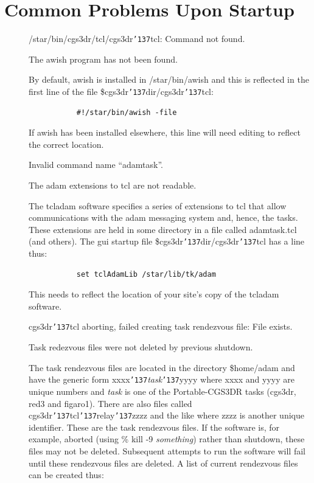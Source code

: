 \documentclass[a4paper]{book}
\renewcommand{\_}{{\tt\char'137}}
\begin{document}
\section{Common Problems Upon Startup}
\begin{description}
\item[] {\sf /star/bin/cgs3dr/tcl/cgs3dr\_tcl: Command not found.}

  The awish program has not been found.

  By default, awish is installed in /star/bin/awish and this is reflected
  in the first line of the file {\sc \$cgs3dr\_dir}/cgs3dr\_tcl:
  \begin{verbatim}
           #!/star/bin/awish -file
  \end{verbatim}
  If awish has been installed elsewhere, this line will need editing to reflect
  the correct location.

\item[] {\sf Invalid command name ``adamtask''.}

  The {\sc adam} extensions to tcl are not readable.

  The {\sc tcladam} software specifies a series of extensions to tcl that allow
  communications with the {\sc adam} messaging system and, hence, the tasks. These
  extensions are held in some directory in a file called adamtask.tcl (and others).
  The {\sc gui} startup file {\sc \$cgs3dr\_dir}/cgs3dr\_tcl has a line thus:
  \begin{verbatim}
           set tclAdamLib /star/lib/tk/adam
  \end{verbatim}
  This needs to reflect the location of your site's copy of the {\sc tcladam} software.

\item[] {\sf cgs3dr\_tcl aborting, failed creating task rendezvous file: File exists.}

  Task redezvous files were not deleted by previous shutdown.

  The task rendezvous files are located in the directory {\sc \$home}/adam and have the generic form
  {\sf xxxx}\_{\em task}\_{\sf yyyy} where {\sf xxxx} and {\sf yyyy} are unique numbers
  and {\em task} is one of the Portable-CGS3DR tasks (cgs3dr, red3 and figaro1).
  There are also files called cgs3dr\_tcl\_relay\_{\sf zzzz} and the like where {\sf zzzz}
  is another unique identifier. These are the task rendezvous files. If the software is,
  for example, aborted (using \% kill -9 {\em something}) rather than shutdown, these files may not be deleted.
  Subsequent attempts to run the software will fail until these rendezvous files are
  deleted. A list of current rendezvous files can be created thus:


\end{description}
\end{document}

